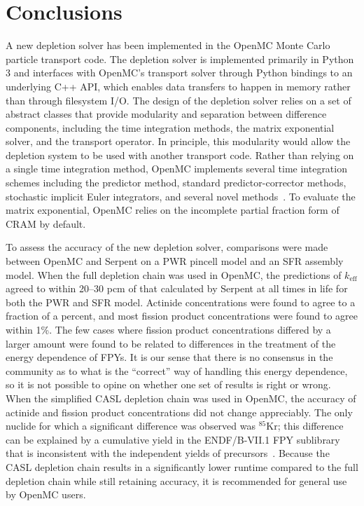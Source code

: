 \documentclass[3p,authoryear]{elsarticle}
\begin{document}
\section{Conclusions}
\label{sec:conclusions}

A new depletion solver has been implemented in the OpenMC Monte Carlo particle
transport code. The depletion solver is implemented primarily in Python 3 and
interfaces with OpenMC's transport solver through Python bindings to an
underlying C++ API, which enables data transfers to happen in memory rather than
through filesystem I/O. The design of the depletion solver relies on a set of
abstract classes that provide modularity and separation between difference
components, including the time integration methods, the matrix exponential
solver, and the transport operator. In principle, this modularity would allow
the depletion system to be used with another transport code. Rather than relying
on a single time integration method, OpenMC implements several time integration
schemes including the predictor method, standard predictor-corrector methods,
stochastic implicit Euler integrators, and several novel
methods~\citep{josey2017phd, josey2017jcp}. To evaluate the matrix exponential,
OpenMC relies on the incomplete partial fraction form of CRAM by default.

To assess the accuracy of the new depletion solver, comparisons were made
between OpenMC and Serpent on a PWR pincell model and an SFR assembly model.
When the full depletion chain was used in OpenMC, the predictions of
$k_\text{eff}$ agreed to within 20--30 pcm of that calculated by Serpent at all
times in life for both the PWR and SFR model. Actinide concentrations were found
to agree to a fraction of a percent, and most fission product concentrations
were found to agree within 1\%. The few cases where fission product
concentrations differed by a larger amount were found to be related to
differences in the treatment of the energy dependence of FPYs. It is our sense
that there is no consensus in the community as to what is the ``correct'' way of
handling this energy dependence, so it is not possible to opine on whether one
set of results is right or wrong. When the simplified CASL depletion chain was
used in OpenMC, the accuracy of actinide and fission product concentrations did
not change appreciably. The only nuclide for which a significant difference was
observed was $^{85}$Kr; this difference can be explained by a cumulative yield
in the ENDF/B-VII.1 FPY sublibrary that is inconsistent with the independent
yields of precursors~\citep{pigni2015nds}. Because the CASL depletion chain
results in a significantly lower runtime compared to the full depletion chain
while still retaining accuracy, it is recommended for general use by OpenMC
users.
\end{document}
